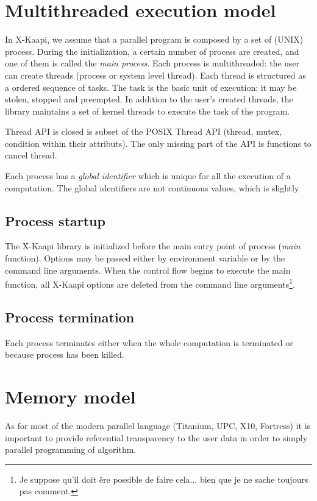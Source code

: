 \documentclass[12pt]{report}
\newcommand{\kaapi}{\textsc{X}-Kaapi\xspace}
\begin{document}
\section{Multithreaded execution model}
In \kaapi, we assume that a parallel program is composed by a set of (UNIX) process. During the initialization, a certain number of process are created, and one of them is called the \textit{main process}. Each process is multithreaded: the user can create threads (process or system level thread). Each thread is structured as a ordered sequence of tasks. The task is the basic unit of execution: it may be stolen, stopped and preempted. In addition to the user's created threads, the  library maintains a set of kernel threads to execute the task of the program.

Thread API is closed is subset of the POSIX Thread API (thread, mutex, condition within their attributs). The only missing part of the API is functions to cancel thread.

Each process has a \textit{global identifier} which is unique for all the execution of a computation. The global identifiers are not continuous values, which is slightly 

\subsection{Process startup}

The \kaapi library is initialized before the main entry point of process (\textit{main} function). Options may be passed either by environment variable or by the command line arguments. When the control flow begins to execute the main function, all \kaapi options are deleted from the command line arguments\footnote{Je suppose qu'il doit êre possible de faire cela... bien que je ne sache toujours pas comment.}.

\subsection{Process termination}
Each process terminates either when the whole computation is terminated or because process has been killed.

\section{Memory model}
As for most of the modern parallel language (Titanium, UPC, X10, Fortress) it is important to provide referential transparency to the user data in order to simply parallel programming of algorithm. 
\end{document}
